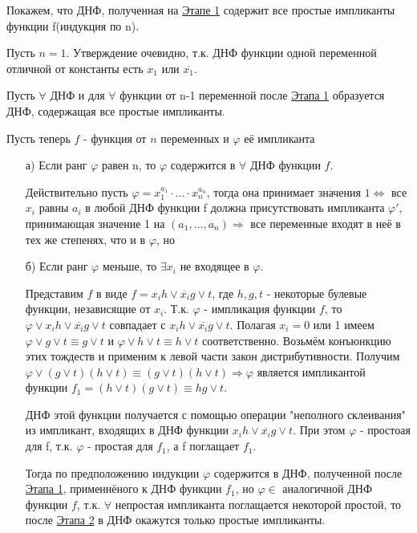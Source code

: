 \proof Покажем, что ДНФ, полученная на \underline{Этапе 1} содержит все простые импликанты функции f(индукция по n).\par
Пусть $n=1$. Утверждение очевидно, т.к. ДНФ функции одной переменной отличной от константы есть $x_1$ или $\overline{x_1}$.\par
Пусть $\forall$ ДНФ и для $\forall$ функции от n-1 переменной после \underline{Этапа 1} образуется ДНФ, содержащая все простые импликанты.\par
Пусть теперь $f$ - функция от $n$ переменных и $\varphi$ её импликанта 
\begin{itemize}
	\item[а)] Если ранг $\varphi$ равен n, то $\varphi$ содержится в $\forall$ ДНФ функции $f$.

Действительно пусть $\varphi = x_1^{a_1}\cdot \dotsc \cdot x_n^{a_n}$, тогда она принимает значения $1 \Leftrightarrow$ все $x_i$ равны $a_i$ в любой ДНФ функции f должна присутствовать импликанта $\varphi'$, принимающая значение 1 на $(a_1, \dotsc, a_n) \Rightarrow$ все переменные входят в неё в тех же степенях, что и в $\varphi$, но

	\item[б)]Если ранг $\varphi$ меньше, то $\exists x_i$ не входящее в $\varphi$.

Представим $f$ в виде $f=x_ih\vee \overline{x_i}g \vee t$, где $h,g,t$ - некоторые булевые функции, независящие от $x_i$.
Т.к. $\varphi$ - импликация функции $f$, то $\varphi\vee x_ih\vee \overline{x_i}g\vee t$ совпадает с $x_ih\vee \overline{x_i}g\vee t$.
Полагая $x_i = 0$ или 1 имеем $\varphi\vee g\vee t\equiv g\vee t$ и $\varphi\vee h\vee t\equiv h\vee t$ соответственно.
Возьмём конъюнкцию этих тождеств и применим к левой части закон дистрибутивности.
Получим $\varphi\vee (g\vee t)(h\vee t) \equiv (g\vee t)(h\vee t) \Rightarrow \varphi$ является импликантой функции $f_1=(h\vee t)(g\vee t)\equiv hg\vee t$.

ДНФ этой функции получается с помощью операции "неполного склеивания" из импликант, входящих в ДНФ функции $x_ih\vee \overline{x_i}g \vee t$.
При этом $\varphi$ - простоая для f, т.к. $\varphi$ - простая для $f_1$, а f поглащает $f_1$.\par

Тогда по предположению индукции $\varphi$ содержится в ДНФ, полученной после \underline{Этапа 1}, применнёного к ДНФ функции $f_1$, но $\varphi \in$ аналогичной ДНФ функции $f$, т.к. $\forall$ непростая импликанта поглащается некоторой простой, то после \underline{Этапа 2} в ДНФ окажутся только простые импликанты.
\end{itemize}

